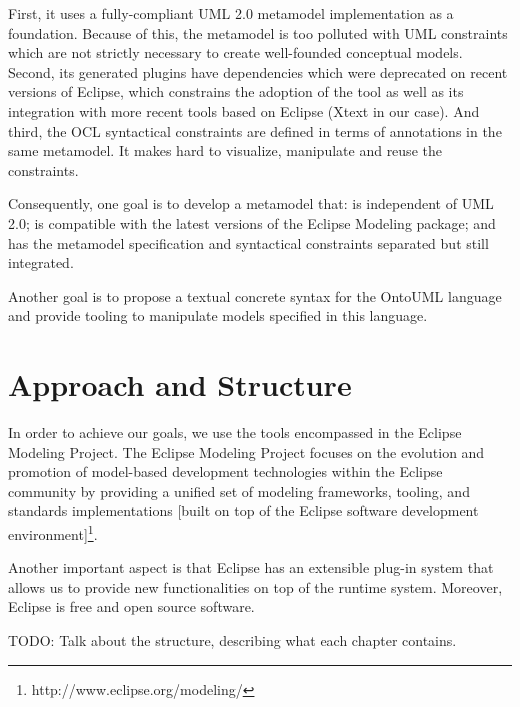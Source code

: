 \documentclass[
  10pt,				%
  oneside,
  a4paper,			%
  brazilian,
  english
]{abntex2}
\begin{document}
First, it uses a fully-compliant UML 2.0 metamodel implementation as a foundation.
Because of this, the metamodel is too polluted with UML constraints which are not
strictly necessary to create well-founded conceptual models.
%
Second, its generated plugins have dependencies which were deprecated on recent
versions of Eclipse, which constrains the adoption of the tool as well as its
integration with more recent tools based on Eclipse (Xtext in our case).
%
%
And third, the OCL syntactical constraints are defined in terms of annotations in
the same metamodel. It makes hard to visualize, manipulate and reuse the constraints.

Consequently, one goal is to develop a metamodel that: is independent of UML 2.0;
is compatible with the latest versions of the Eclipse Modeling package;
and has the metamodel specification and syntactical constraints separated but
still integrated.

Another goal is to propose a textual concrete syntax for the OntoUML language and
provide tooling to manipulate models specified in this language.
%

\section{Approach and Structure}

In order to achieve our goals, we use the tools encompassed in the Eclipse Modeling
Project. The Eclipse Modeling Project focuses on the evolution and promotion of
model-based development technologies
within the Eclipse community by providing a unified set of modeling frameworks,
tooling, and standards implementations [built on top of the Eclipse software
development environment]\footnote{http://www.eclipse.org/modeling/}.

Another important aspect is that Eclipse has an extensible plug-in system that
allows us to provide new functionalities on top of the runtime system.
Moreover, Eclipse is free and open source software.

TODO: Talk about the structure, describing what each chapter contains.
\end{document}
